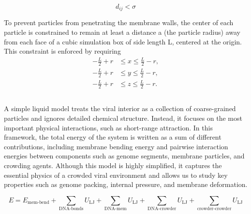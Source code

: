 \documentclass[12pt]{article}
\begin{document}
\begin{flushleft}
\begin{equation}
d_{ij}< \sigma
\end{equation}

 

 
To prevent particles from penetrating the membrane walls, the center of each particle is constrained to remain at least a distance 
a (the particle radius) away from each face of a cubic simulation box of side length L, centered at the origin. This constraint is enforced by requiring
\begin{equation}
\begin{aligned}
-\frac{L}{2}+r &\le x \le \frac{L}{2}-r,\\
-\frac{L}{2}+r &\le y \le \frac{L}{2}-r,\\
-\frac{L}{2}+r &\le z \le \frac{L}{2}-r.
\end{aligned}
\end{equation}






\subsection*{}


A simple liquid model treats the viral interior as a collection of coarse-grained particles and ignores detailed chemical structure. Instead, it focuses on the most important physical interactions, such as short-range attraction. In this framework, the total energy of the system is written as a sum of different contributions, including membrane bending energy and pairwise interaction energies between components such as genome segments, membrane particles, and crowding agents. Although this model is highly simplified, it captures the essential physics of a crowded viral environment and allows us to study key properties such as genome packing, internal pressure, and membrane deformation.

\begin{equation}
E = E_{\text{mem-bend}}+\sum_{\text{DNA-bonds}} U_{\mathrm{LJ}} + \sum_{\text{DNA-mem}} U_{\mathrm{LJ}} 
+ \sum_{\text{DNA-crowder}} U_{\mathrm{LJ}} 
+ \sum_{\text{crowder-crowder}} U_{\mathrm{LJ}}
\end{equation} 

\subsection*{}




\end{flushleft}
\end{document}
